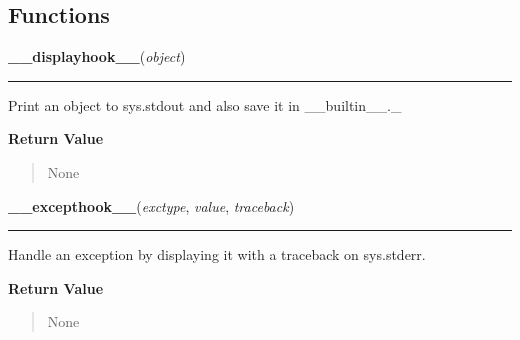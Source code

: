   \subsection{Functions}

    \label{sys:displayhook}

    \vspace{0.5ex}

\hspace{.8\funcindent}\begin{boxedminipage}{\funcwidth}

    \raggedright \textbf{\_\_displayhook\_\_}(\textit{object})

    \vspace{-1.5ex}

    \rule{\textwidth}{0.5\fboxrule}
\setlength{\parskip}{2ex}
    Print an object to sys.stdout and also save it in \_\_builtin\_\_.\_

\setlength{\parskip}{1ex}
      \textbf{Return Value}
    \vspace{-1ex}

      \begin{quote}
      None

      \end{quote}

    \end{boxedminipage}

    \label{sys:excepthook}

    \vspace{0.5ex}

\hspace{.8\funcindent}\begin{boxedminipage}{\funcwidth}

    \raggedright \textbf{\_\_excepthook\_\_}(\textit{exctype}, \textit{value}, \textit{traceback})

    \vspace{-1.5ex}

    \rule{\textwidth}{0.5\fboxrule}
\setlength{\parskip}{2ex}
    Handle an exception by displaying it with a traceback on sys.stderr.

\setlength{\parskip}{1ex}
      \textbf{Return Value}
    \vspace{-1ex}

      \begin{quote}
      None

      \end{quote}

    \end{boxedminipage}

